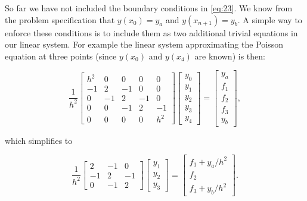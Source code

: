 So far we have not included the boundary conditions in \eqref{eq:23}. We know
from the problem specification that $y(x_{0})=y_{a}$ and $y(x_{n+1})=y_{b}$.  A
simple way to enforce these conditions is to include them as two additional
trivial equations in our linear system. For example the linear system
approximating the Poisson equation at three points (since $y(x_{0})$ and
$y(x_{4})$ are known) is then:

\begin{equation*}
  \dfrac{1}{h^{2}}\left[
    \begin{array}{ccccc}
      h^{2} & 0 & 0 & 0 & 0\\
      -1 & 2 & -1 & 0 & 0\\
      0 & -1 & 2 & -1 & 0\\
      0 & 0 & -1 & 2 & -1\\
      0 & 0 & 0 & 0 & h^{2}
    \end{array}
  \right]\left[
    \begin{array}{c}
      y_{0}\\ y_{1}\\ y_{2}\\ y_{3}\\ y_{4}
    \end{array}
  \right]  =  \left[
    \begin{array}{c}
      y_{a}\\ f_{1}\\ f_{2}\\ f_{3}\\ y_{b}
    \end{array}
  \right],
\end{equation*}

which simplifies to

\begin{equation}
  \dfrac{1}{h^{2}}\left[
    \begin{array}{ccc}
      2 & -1 & 0\\
      -1 & 2 & -1\\
      0 & -1 & 2
    \end{array}
  \right]\left[
    \begin{array}{c}
      y_{1}\\ y_{2}\\ y_{3}
    \end{array}
  \right]=\left[
    \begin{array}{c}
      f_{1}+y_{a}/h^{2}\\ f_{2}\\ f_{3}+y_{b}/h^{2}
    \end{array}
  \right].
  \label{eq:simple-linear-eq-finite-diff-1}
\end{equation}

